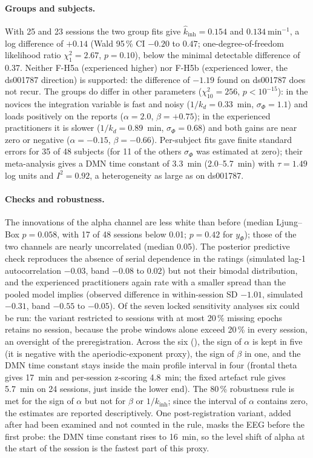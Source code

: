 \documentclass[12pt,a4paper]{article}
\theoremstyle{plain}
\theoremstyle{definition}
\theoremstyle{remark}
\newcommand{\kinh}{k_{\mathrm{inh}}}
\newcommand{\kd}{k_{d}}
\newcommand{\sPhi}{\sigma_{\Phi}}
\begin{document}
\paragraph{Groups and subjects.} With 25 and 23 sessions the two group fits give $\hat k_{\mathrm{inh}}=0.154$ and $0.134~\mathrm{min^{-1}}$, a log difference of $+0.14$ (Wald 95\,\% CI $-0.20$ to $0.47$; one-degree-of-freedom likelihood ratio $\chi^2_1=2.67$, $p=0.10$), below the minimal detectable difference of 0.37. Neither F-H5a (experienced higher) nor F-H5b (experienced lower, the ds001787 direction) is supported: the difference of $-1.19$ found on ds001787 does not recur. The groups do differ in other parameters ($\chi^2_{10}=256$, $p<10^{-15}$): in the novices the integration variable is fast and noisy ($1/\kd=0.33$~min, $\sPhi=1.1$) and loads positively on the reports ($\alpha=2.0$, $\beta=+0.75$); in the experienced practitioners it is slower ($1/\kd=0.89$~min, $\sPhi=0.68$) and both gains are near zero or negative ($\alpha=-0.15$, $\beta=-0.66$). Per-subject fits gave finite standard errors for 35 of 48 subjects (for 11 of the others $\sPhi$ was estimated at zero); their meta-analysis gives a DMN time constant of 3.3~min (2.0--5.7~min) with $\tau=1.49$ log units and $I^2=0.92$, a heterogeneity as large as on ds001787.

\paragraph{Checks and robustness.} The innovations of the alpha channel are less white than before (median Ljung--Box $p=0.058$, with 17 of 48 sessions below 0.01; $p=0.42$ for $y_\Phi$); those of the two channels are nearly uncorrelated (median 0.05). The posterior predictive check reproduces the absence of serial dependence in the ratings (simulated lag-1 autocorrelation $-0.03$, band $-0.08$ to $0.02$) but not their bimodal distribution, and the experienced practitioners again rate with a smaller spread than the pooled model implies (observed difference in within-session SD $-1.01$, simulated $-0.31$, band $-0.55$ to $-0.05$). Of the seven locked sensitivity analyses six could be run: the variant restricted to sessions with at most 20\,\% missing epochs retains no session, because the probe windows alone exceed 20\,\% in every session, an oversight of the preregistration. Across the six (), the sign of $\alpha$ is kept in five (it is negative with the aperiodic-exponent proxy), the sign of $\beta$ in one, and the DMN time constant stays inside the main profile interval in four (frontal theta gives 17~min and per-session z-scoring 4.8~min; the fixed artefact rule gives 5.7~min on 24 sessions, just inside the lower end). The 80\,\% robustness rule is met for the sign of $\alpha$ but not for $\beta$ or $1/\kinh$; since the interval of $\alpha$ contains zero, the estimates are reported descriptively. One post-registration variant, added after  had been examined and not counted in the rule, masks the EEG before the first probe: the DMN time constant rises to 16~min, so the level shift of alpha at the start of the session is the fastest part of this proxy.
\end{document}
